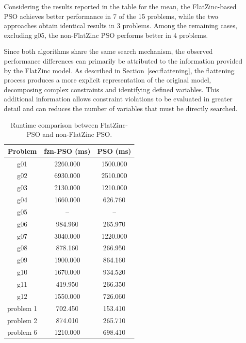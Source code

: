 Considering the results reported in the table for the mean, the FlatZinc-based PSO achieves better performance in 7 of the 15 problems, while the two approaches obtain identical results in 3 problems. Among the remaining cases, excluding g05, the non-FlatZinc PSO performs better in 4 problems.

Since both algorithms share the same search mechanism, the observed performance differences can primarily be attributed to the information provided by the FlatZinc model. As described in Section~\ref{sec:flattening}, the flattening process produces a more explicit representation of the original model, decomposing complex constraints and identifying defined variables. This additional information allows constraint violations to be evaluated in greater detail and can reduces the number of variables that must be directly searched.

\begin{table}[t]
	\centering
	\footnotesize
	\caption{Runtime comparison between FlatZinc-PSO and non-FlatZinc PSO.}
	\label{tab:runtime_comparison}
	\setlength{\tabcolsep}{5pt}
	\begin{tabular}{ccc}
		\toprule
		\textbf{Problem} & \textbf{fzn-PSO (ms)} & \textbf{PSO (ms)} \\
		\midrule
		
		g01 & 2260.000 & 1500.000 \\
		\midrule
		
		g02 & 6930.000 & 2510.000 \\
		\midrule
		
		g03 & 2130.000 & 1210.000 \\
		\midrule
		
		g04 & 1660.000 & 626.760 \\
		\midrule
		
		g05 & -- & -- \\
		\midrule
		
		g06 & 984.960 & 265.970 \\
		\midrule
		
		g07 & 3040.000 & 1220.000 \\
		\midrule
		
		g08 & 878.160 & 266.950 \\
		\midrule
		
		g09 & 1900.000 & 864.160 \\
		\midrule
		
		g10 & 1670.000 & 934.520 \\
		\midrule
		
		g11 & 419.950 & 266.350 \\
		\midrule
		
		g12 & 1550.000 & 726.060 \\
		\midrule
		
		problem 1 & 702.450 & 153.410 \\
		\midrule
		
		problem 2 & 874.010 & 265.710 \\
		\midrule
		
		problem 6 & 1210.000 & 698.410 \\
		
		\bottomrule
	\end{tabular}
\end{table}


